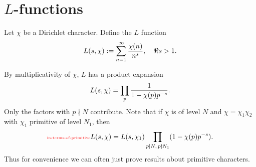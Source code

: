 \section{$L$-functions}
\begin{df}\label{l-func-def}
Let $\chi$ be a Dirichlet character. Define the $L$ function
\[
L(s,\chi):=\sum_{n=1}^{\infty} \frac{\chi(n)}{n^s},\quad \Re s>1.
\]
\end{df}
By multiplicativity of $\chi$, $L$ has a product expansion
\[
L(s,\chi)=\prod_{p}\frac{1}{1-\chi(p)p^{-s}}.
\]
Only the factors with $p\nmid N$ contribute.
Note that if $\chi$ is of level $N$ and $\chi=\chi_1\chi_2$ with $\chi_1$ primitive of level $N_1$, then
\begin{equation}\llabel{in-terms-of-primitive}
L(s,\chi)=L(s,\chi_1)\prod_{p\mid N,\,p\nmid N_1}(1-\chi(p)p^{-s}).
\end{equation}
Thus for convenience we can often just prove results about primitive characters.

